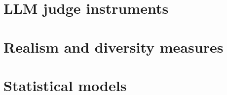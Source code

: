 \section{LLM judge instruments}



\section{Realism and diversity measures}


\section{Statistical models}


